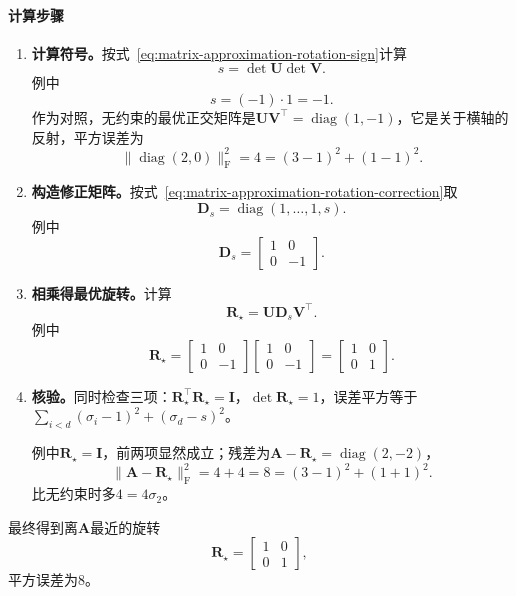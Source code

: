 \paragraph{计算步骤}
\begin{enumerate}
 \item \textbf{计算符号。}按式~\eqref{eq:matrix-approximation-rotation-sign}计算
 \[
  s=\det\bm U\det\bm V .
 \]
 例中
 \[
  s=(-1)\cdot1=-1 .
 \]
 作为对照，无约束的最优正交矩阵是$\bm U\bm V^\top=\operatorname{diag}(1,-1)$，它是关于横轴的反射，平方误差为
 \[
  \lVert\operatorname{diag}(2,0)\rVert_{\mathrm F}^2=4=(3-1)^2+(1-1)^2 .
 \]

 \item \textbf{构造修正矩阵。}按式~\eqref{eq:matrix-approximation-rotation-correction}取
 \[
  \bm D_s=\operatorname{diag}(1,\ldots,1,s).
 \]
 例中
 \[
  \bm D_s=\begin{bmatrix}1&0\\0&-1\end{bmatrix}.
 \]

 \item \textbf{相乘得最优旋转。}计算
 \begin{equation}
  \bm R_\star=\bm U\bm D_s\bm V^\top .
  \label{eq:matrix-approximation-rotation-optimum}
 \end{equation}
 例中
 \[
  \bm R_\star=\begin{bmatrix}1&0\\0&-1\end{bmatrix}\begin{bmatrix}1&0\\0&-1\end{bmatrix}=\begin{bmatrix}1&0\\0&1\end{bmatrix}.
 \]

 \item \textbf{核验。}同时检查三项：$\bm R_\star^\top\bm R_\star=\bm I$，$\det\bm R_\star=1$，误差平方等于$\sum_{i<d}(\sigma_i-1)^2+(\sigma_d-s)^2$。

 例中$\bm R_\star=\bm I$，前两项显然成立；残差为$\bm A-\bm R_\star=\operatorname{diag}(2,-2)$，
 \[
  \lVert\bm A-\bm R_\star\rVert_{\mathrm F}^2=4+4=8=(3-1)^2+(1+1)^2 .
 \]
 比无约束时多$4=4\sigma_2$。
\end{enumerate}

最终得到离$\bm A$最近的旋转
\[
 \bm R_\star=\begin{bmatrix}1&0\\0&1\end{bmatrix},
\]
平方误差为$8$。

